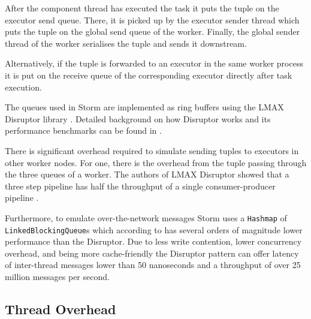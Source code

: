 After the component thread has executed the task it puts the tuple on the executor send queue. There, it is picked up by the executor sender thread which puts the tuple on the global send queue of the worker. Finally, the global sender thread of the worker serialises the tuple and sends it downstream.

Alternatively, if the tuple is forwarded to an executor in the same worker process it is put on the receive queue of the corresponding executor directly after task execution.

The queues used in Storm are implemented as ring buffers using the LMAX Disruptor library \citep{LMAXDisruptor}. Detailed background on how Disruptor works and its performance benchmarks can be found in \citep{Thompson_Farley_Barker_Gee_Stewart_2011}.

There is significant overhead required to simulate sending tuples to executors in other worker nodes. For one, there is the overhead from the tuple passing through the three queues of a worker. The authors of LMAX Disruptor showed that a three step pipeline has half the throughput of a single consumer-producer pipeline \citep{DisruptorWiki}.

Furthermore, to emulate over-the-network messages Storm uses a \texttt{Hashmap} of \texttt{LinkedBlockingQueue}s which according to \cite{Thompson_Farley_Barker_Gee_Stewart_2011} has several orders of magnitude lower performance than the Disruptor. Due to less write contention, lower concurrency overhead, and being more cache-friendly the Disruptor pattern can offer latency of inter-thread messages lower than 50 nanoseconds and a throughput of over 25 million messages per second.

\subsection{Thread Overhead}

